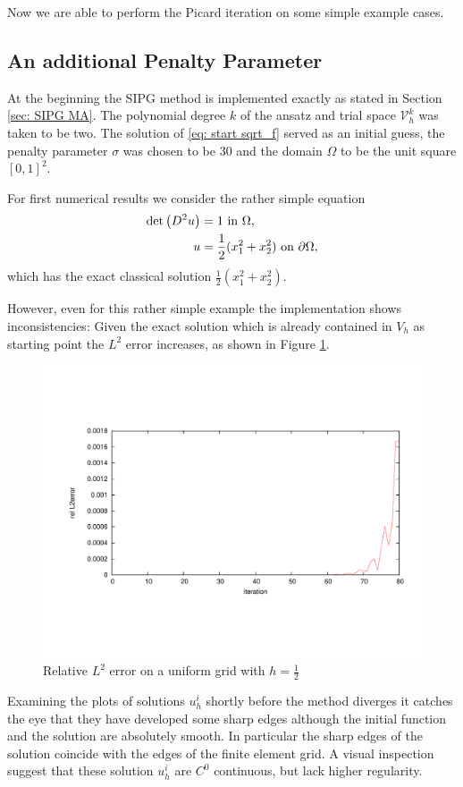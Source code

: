 Now we are able to perform the Picard iteration on some simple example cases.
\subsection{An additional Penalty Parameter} \label{subsec: add penalty param}
At the beginning the SIPG method is implemented exactly as stated in Section \ref{sec: SIPG MA}. The polynomial degree $k$ of the ansatz and trial space $\mathcal V_h^k$ was taken to be two.
The solution of \eqref{eq: start sqrt_f} served as an initial guess, the penalty parameter $\sigma$ was chosen to be 30 and the domain $\Omega$ to be the unit square $[0,1]^2$.

For first numerical results we consider the rather simple equation
\begin{align}
	\det{\left(D^2 u\right)} &= 1 \text{ in } \Omega, \\ 
	u &= \frac 1 2 (x_1^2 + x_2^2 )\text{ on }\partial \Omega,
\end{align}
which has the exact classical solution $\frac 1 2 (x_1^2 + x_2^2 )$. 

However, even for this rather simple example the implementation shows inconsistencies: Given the exact solution which is already contained in $V_h$ as starting point the $L^2$ error increases, as shown in Figure \ref{fig: consisctency_first_try}.
\begin{figure}[H]
	\centering
	\includegraphics[trim = 2cm 4cm 1cm 4cm, width=1\textwidth]{plots/consisctency_first_try.pdf}
	\caption{Relative $L^2$ error on a uniform grid with $h=\frac 1 2$}
	\label{fig: consisctency_first_try}
\end{figure}
Examining the plots of solutions $u^i_h$ shortly before the method diverges it catches the eye that they have developed some sharp edges although the initial function and the solution are absolutely smooth. In particular the sharp edges of the solution coincide with the edges of the finite element grid. A visual inspection suggest that these solution $u^i_h$ are $C^0$ continuous, but lack higher regularity.


